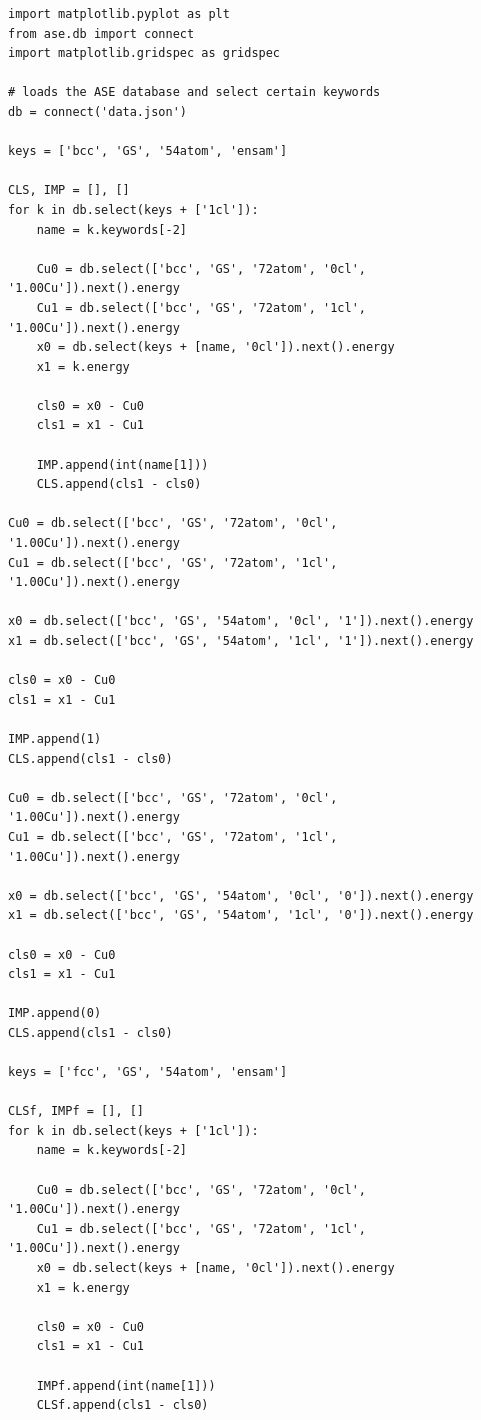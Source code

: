 \documentclass[number, sort&compress, review, 12pt]{elsarticle}
\begin{document}
\begin{verbatim}
import matplotlib.pyplot as plt
from ase.db import connect
import matplotlib.gridspec as gridspec

# loads the ASE database and select certain keywords
db = connect('data.json')

keys = ['bcc', 'GS', '54atom', 'ensam']

CLS, IMP = [], []
for k in db.select(keys + ['1cl']):
    name = k.keywords[-2]

    Cu0 = db.select(['bcc', 'GS', '72atom', '0cl', '1.00Cu']).next().energy
    Cu1 = db.select(['bcc', 'GS', '72atom', '1cl', '1.00Cu']).next().energy
    x0 = db.select(keys + [name, '0cl']).next().energy
    x1 = k.energy

    cls0 = x0 - Cu0
    cls1 = x1 - Cu1

    IMP.append(int(name[1]))
    CLS.append(cls1 - cls0)

Cu0 = db.select(['bcc', 'GS', '72atom', '0cl', '1.00Cu']).next().energy
Cu1 = db.select(['bcc', 'GS', '72atom', '1cl', '1.00Cu']).next().energy

x0 = db.select(['bcc', 'GS', '54atom', '0cl', '1']).next().energy
x1 = db.select(['bcc', 'GS', '54atom', '1cl', '1']).next().energy

cls0 = x0 - Cu0
cls1 = x1 - Cu1

IMP.append(1)
CLS.append(cls1 - cls0)

Cu0 = db.select(['bcc', 'GS', '72atom', '0cl', '1.00Cu']).next().energy
Cu1 = db.select(['bcc', 'GS', '72atom', '1cl', '1.00Cu']).next().energy

x0 = db.select(['bcc', 'GS', '54atom', '0cl', '0']).next().energy
x1 = db.select(['bcc', 'GS', '54atom', '1cl', '0']).next().energy

cls0 = x0 - Cu0
cls1 = x1 - Cu1

IMP.append(0)
CLS.append(cls1 - cls0)

keys = ['fcc', 'GS', '54atom', 'ensam']

CLSf, IMPf = [], []
for k in db.select(keys + ['1cl']):
    name = k.keywords[-2]

    Cu0 = db.select(['bcc', 'GS', '72atom', '0cl', '1.00Cu']).next().energy
    Cu1 = db.select(['bcc', 'GS', '72atom', '1cl', '1.00Cu']).next().energy
    x0 = db.select(keys + [name, '0cl']).next().energy
    x1 = k.energy

    cls0 = x0 - Cu0
    cls1 = x1 - Cu1

    IMPf.append(int(name[1]))
    CLSf.append(cls1 - cls0)


\end{verbatim}
\end{document}
